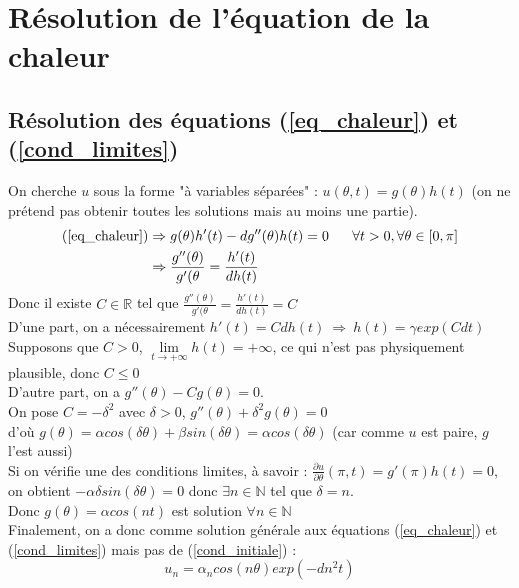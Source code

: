 \documentclass[a4paper,10pt]{report}
\begin{document}
\section{Résolution de l'équation de la chaleur}
\subsection{Résolution des équations (\ref{eq_chaleur}) et (\ref{cond_limites})}
On cherche $u$ sous la forme "à variables séparées" : $u(\theta,t)=g(\theta)h(t)$ (on ne prétend pas obtenir toutes les solutions mais au moins une partie).
\begin{align*}
\text{(\ref{eq_chaleur})} & \Rightarrow g(\theta)h'(t)-dg''(\theta)h(t) = 0 \ \ \ \ \ \forall t >0, \forall \theta \in [0,\pi] \\
						  & \Rightarrow \frac{g''(\theta)}{g'(\theta} = \frac{h'(t)}{dh(t)}
\end{align*}
Donc il existe $C \in \mathbb{R}$ tel que $\frac{g''(\theta)}{g'(\theta} = \frac{h'(t)}{dh(t)}=C$ \\
D'une part, on a nécessairement $h'(t)=Cdh(t) \ \Rightarrow \ h(t)=\gamma exp(Cdt)$ \\
Supposons que $C>0$, $\lim \limits_{t\rightarrow +\infty} h(t) = +\infty$, ce qui n'est pas physiquement plausible, donc $C\leq 0$ \\
D'autre part, on a $g''(\theta)-Cg(\theta)=0$.\\
On pose $C=-\delta^2$ avec $\delta>0$, $g''(\theta)+\delta^2g(\theta)=0$\\
d'où $g(\theta)=\alpha cos(\delta \theta) + \beta sin(\delta \theta) = \alpha cos(\delta \theta)$ (car comme $u$ est paire, $g$ l'est aussi) \\
Si on vérifie une des conditions limites, à savoir : $\frac{\partial u}{\partial \theta}(\pi,t)=g'(\pi)h(t)=0$, \\
on obtient $-\alpha \delta sin(\delta \theta)=0$ donc $\exists n \in \mathbb{N}$ tel que $\delta=n$.\\
Donc $g(\theta)=\alpha cos(nt)$ est solution $\forall n \in \mathbb{N}$ \\
Finalement, on a donc comme solution générale aux équations (\ref{eq_chaleur}) et (\ref{cond_limites}) mais pas de (\ref{cond_initiale}) :
\abovedisplayskip=0mm
\begin{displaymath}
u_n = \alpha_n cos(n \theta) exp(-dn^2t)
\end{displaymath}
\end{document}

